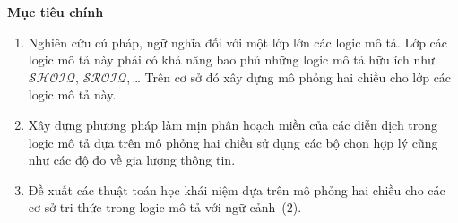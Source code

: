 \documentclass[notheorems,xcolor=dvipsnames]{beamer}
\newcommand{\SigmaC}	{\Sigma_C}
\newcommand{\SigmaR}	{\Sigma_R}
\newcommand{\ALC}		{$\mathcal{ALC}$\xspace}
\newcommand{\SHOIQ}		{$\mathcal{SHOIQ}$\xspace}
\newcommand{\SROIQ}		{$\mathcal{SROIQ}$\xspace}
\newcommand{\myend}		{\mbox{}\hfill\mbox{{\tiny$\!\blacksquare$}}}
\newcommand{\mand}		{\sqcap}
\newcommand{\mor}		{\sqcup}
\newcommand{\V}			{\forall}
\newcommand{\E}			{\exists}
\begin{document}
\begin{frame}{\bf Mục tiêu chính}
	\begin{enumerate}
		\setlength{\itemsep}{2.0ex}
		\item Nghiên cứu cú pháp, ngữ nghĩa đối với một lớp lớn các logic mô tả. Lớp các logic mô tả này phải có khả năng bao phủ những logic mô tả hữu ích như \SHOIQ, \SROIQ,\,\ldots\; Trên cơ sở đó xây dựng mô phỏng hai chiều cho lớp các logic mô tả này.
			
		\item Xây dựng phương pháp làm mịn phân hoạch miền của các diễn dịch trong logic mô tả dựa trên mô phỏng hai chiều sử dụng các bộ chọn hợp lý cũng như các độ đo về gia lượng thông tin.
		
		\item Đề xuất các thuật toán học khái niệm dựa trên mô phỏng hai chiều cho các cơ sở tri thức trong logic mô tả với ngữ cảnh~(2).
	\end{enumerate}
\end{frame}
%
\end{document}
